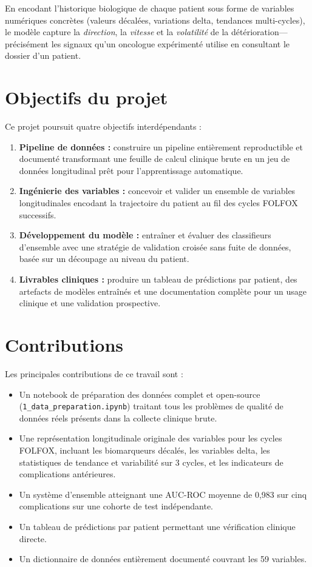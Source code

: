 \documentclass[12pt,a4paper]{report}
\begin{document}
En encodant l'historique biologique de chaque patient sous forme de variables numériques concrètes (valeurs décalées, variations delta, tendances multi-cycles), le modèle capture la \emph{direction}, la \emph{vitesse} et la \emph{volatilité} de la détérioration---précisément les signaux qu'un oncologue expérimenté utilise en consultant le dossier d'un patient.

\section{Objectifs du projet}

Ce projet poursuit quatre objectifs interdépendants :
\begin{enumerate}
  \item \textbf{Pipeline de données :} construire un pipeline entièrement reproductible et documenté transformant une feuille de calcul clinique brute en un jeu de données longitudinal prêt pour l'apprentissage automatique.
  \item \textbf{Ingénierie des variables :} concevoir et valider un ensemble de variables longitudinales encodant la trajectoire du patient au fil des cycles FOLFOX successifs.
  \item \textbf{Développement du modèle :} entraîner et évaluer des classifieurs d'ensemble avec une stratégie de validation croisée sans fuite de données, basée sur un découpage au niveau du patient.
  \item \textbf{Livrables cliniques :} produire un tableau de prédictions par patient, des artefacts de modèles entraînés et une documentation complète pour un usage clinique et une validation prospective.
\end{enumerate}

\section{Contributions}

Les principales contributions de ce travail sont :
\begin{itemize}
  \item Un notebook de préparation des données complet et open-source ({\tt 1\_data\_preparation.ipynb}) traitant tous les problèmes de qualité de données réels présents dans la collecte clinique brute.
  \item Une représentation longitudinale originale des variables pour les cycles FOLFOX, incluant les biomarqueurs décalés, les variables delta, les statistiques de tendance et variabilité sur 3 cycles, et les indicateurs de complications antérieures.
  \item Un système d'ensemble atteignant une AUC-ROC moyenne de 0,983 sur cinq complications sur une cohorte de test indépendante.
  \item Un tableau de prédictions par patient permettant une vérification clinique directe.
  \item Un dictionnaire de données entièrement documenté couvrant les 59 variables.
\end{itemize}
\end{document}
